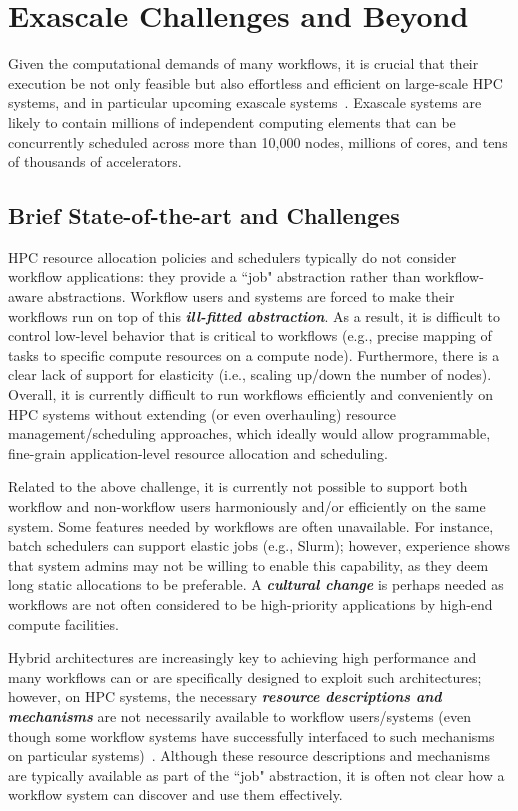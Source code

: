 \section{Exascale Challenges and Beyond}
\label{sec:exascale}

Given the computational demands of many workflows, it is crucial that their execution be not only feasible but also effortless and efficient on large-scale HPC systems, and in particular upcoming exascale systems~\cite{ferreiradasilva-fgcs-2017}. Exascale systems are likely to contain millions of independent computing elements that can be concurrently scheduled across more than 10,000 nodes, millions of cores, and tens of thousands of accelerators.


\subsection{Brief State-of-the-art and Challenges}

HPC resource allocation policies and schedulers  typically do not consider workflow applications: they provide a ``job" abstraction rather than workflow-aware abstractions. Workflow users and systems are forced to make their workflows run on top of this \textbf{\emph{ill-fitted abstraction}}. As a result, it is difficult to control low-level behavior that is critical to workflows (e.g., precise mapping of tasks to specific compute resources on a compute node). Furthermore, there is a clear lack of support for elasticity (i.e., scaling up/down the number of nodes). Overall, it is currently difficult to run workflows efficiently and conveniently on HPC systems without extending (or even overhauling) resource management/scheduling approaches, which ideally would allow programmable, fine-grain application-level resource allocation and scheduling.

Related to the above challenge, it is currently not possible to support both workflow and non-workflow users harmoniously and/or efficiently on the same system. Some features needed by workflows are often unavailable. For instance, batch schedulers can support elastic jobs (e.g., Slurm); however, experience shows that system admins may not be willing to enable this capability, as they deem long static allocations to be preferable. A \textbf{\emph{cultural change}} is perhaps needed as workflows are not often considered to be high-priority applications by high-end compute facilities.

Hybrid architectures are increasingly key to achieving high performance and many workflows can or are specifically designed to exploit such architectures; however, on HPC systems, the necessary \textbf{\emph{resource descriptions and mechanisms}} are not necessarily available to workflow users/systems (even though some workflow systems have successfully interfaced to such mechanisms on particular systems)~\cite{ahn2020flux}. Although these resource descriptions and mechanisms are typically available as part of the ``job" abstraction, it is often not clear how a workflow system can discover and use them effectively.

